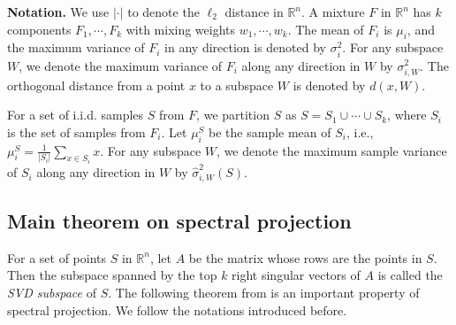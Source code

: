 \documentclass[11pt,letter]{article}
\begin{document}
\noindent\textbf{Notation.}
We use $|\cdot|$ to denote the $\ell_2$ distance in $\mathbb R^n$.
A mixture $F$ in $\mathbb R^n$ has $k$ components $F_1, \cdots, F_k$ with mixing weights $w_1, \cdots, w_k$. The mean of $F_i$ is $\mu_i$, and the maximum variance of $F_i$ in any direction is denoted by $\sigma_i^2$. For any subspace $W$, we denote the maximum variance of $F_i$ along any direction in $W$ by $\sigma_{i, W}^2$.
The orthogonal distance from a point $x$ to a subspace $W$ is denoted by $d(x, W)$.

For a set of i.i.d. samples $S$ from $F$, we partition $S$ as $S = S_1 \cup \cdots \cup S_k$, where $S_i$ is the set of samples from $F_i$. Let $\mu_i^S$ be the sample mean of $S_i$, i.e.,
$\mu_i^S = \frac{1}{|S_i|} \sum_{x\in S_i} x$.
For any subspace $W$, we denote the maximum sample variance of $S_i$ along any direction in $W$ by $\hat \sigma_{i, W}^2(S)$.

\subsection{Main theorem on spectral projection}

For a set of points $S$ in $\mathbb R^n$, let $A$ be the matrix whose rows are the points in $S$. Then the subspace spanned by the top $k$ right singular vectors of $A$ is called the \emph{SVD subspace} of $S$. The following theorem from \cite{Kannan08spectral} is an important property of spectral projection. We follow the notations introduced before.
\end{document}
